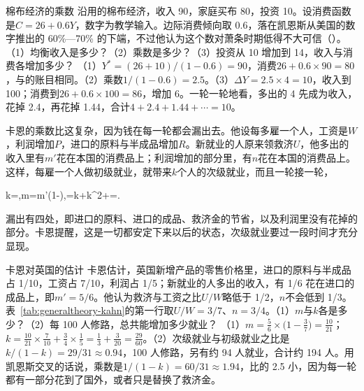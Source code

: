 \begin{example}{棉布经济的乘数}\label{ex:generaltheory-cross}
沿用的棉布经济，收入 90，家庭买布 80，投资 10。设消费函数是$C=26+0.6Y$，数字为教学输入。边际消费倾向取 0.6，落在凯恩斯从美国的数字推出的 60\%—70\% 的下端，不过他认为这个数对萧条时期低得不大可信（）。（1）均衡收入是多少？（2）乘数是多少？（3）投资从 10 增加到 14，收入与消费各增加多少？
\solution （1）$Y^{*}=(26+10)/(1-0.6)=90$，消费$26+0.6\times90=80$，与的账目相同。（2）乘数$1/(1-0.6)=2.5$。（3）$\Delta Y=2.5\times4=10$，收入到 100；消费到$26+0.6\times100=86$，增加 6。一轮一轮地看，多出的 4 先成为收入，花掉 2.4，再花掉 1.44，合计$4+2.4+1.44+\cdots=10$。
\end{example}

卡恩的乘数比这复杂，因为钱在每一轮都会漏出去\cite{kahn1931}。他设每多雇一个人，工资是$W$，利润增加$P$，进口的原料与半成品增加$R$。新就业的人原来领救济$U$，他多出的收入里有$m'$花在本国的消费品上；利润增加的部分里，有$n$花在本国的消费品上\cite{kahn1931}。这样，每雇一个人做初级就业，就带来$k$个人的次级就业，而且一轮接一轮，
\begin{keyeq}
k=,\qquad m=m'\left(1-\right),\qquad {}=k+k^{2}+\cdots=.\label{eq:generaltheory-kahn}
\end{keyeq}
漏出有四处，即进口的原料、进口的成品、救济金的节省，以及利润里没有花掉的部分。卡恩提醒，这是一切都安定下来以后的状态，次级就业要过一段时间才充分显现\cite{kahn1931}。

\begin{example}{卡恩对英国的估计}\label{ex:generaltheory-kahn}
卡恩估计，英国新增产品的零售价格里，进口的原料与半成品占 1/10，工资占 7/10，利润占 1/5；新就业的人多出的收入，有 1/6 花在进口的成品上，即$m'=5/6$。他认为救济与工资之比$U/W$略低于 1/2，$n$不会低到 1/3\cite{kahn1931}。表~\ref{tab:generaltheory-kahn}的第一行取$U/W=3/7$、$n=3/4$。（1）$m$与$k$各是多少？（2）每 100 人修路，总共能增加多少就业？
\solution （1）$m=\frac{5}{6}\times\bigl(1-\frac{3}{7}\bigr)=\frac{10}{21}$；$k=\frac{10}{21}\times\frac{7}{10}+\frac{3}{4}\times\frac{1}{5}=\frac{1}{3}+\frac{3}{20}=\frac{29}{60}$。（2）次级就业与初级就业之比是$k/(1-k)=29/31\approx0.94$，100 人修路，另有约 94 人就业，合计约 194 人。用凯恩斯交叉的话说，乘数是$1/(1-k)=60/31\approx1.94$，比的 2.5 小，因为每一轮都有一部分花到了国外，或者只是替换了救济金。
\end{example}

